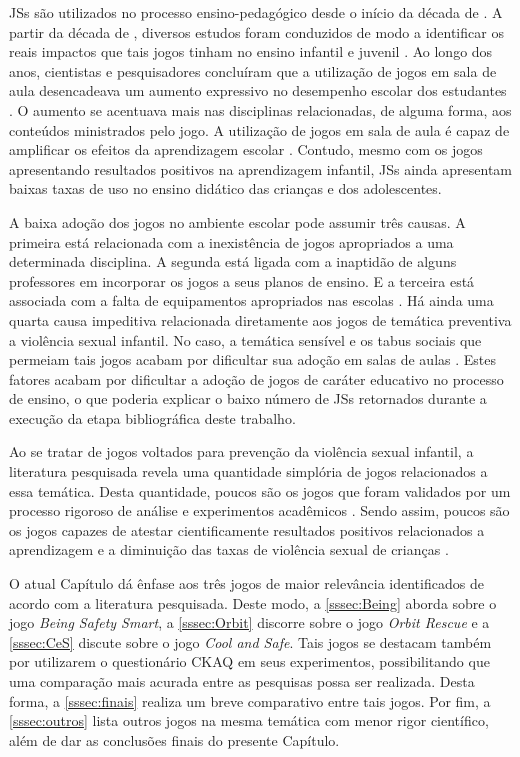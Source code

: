 \acfp{JS} são utilizados no processo ensino-pedagógico desde o início da década de \citeyear{clark1970serious}. A partir da década de \citeyear{clark1970serious}, diversos estudos foram conduzidos de modo a identificar os reais impactos que tais jogos tinham no ensino infantil e juvenil \cite{stieler2016paper}. Ao longo dos anos, cientistas e pesquisadores concluíram que a utilização de jogos em sala de aula desencadeava um aumento expressivo no desempenho escolar dos estudantes \cite{wentzel1998social}. O aumento se acentuava mais nas disciplinas relacionadas, de alguma forma, aos conteúdos ministrados pelo jogo. A utilização de jogos em sala de aula é capaz de amplificar os efeitos da aprendizagem escolar \cite{jones2020serious}. Contudo, mesmo com os jogos apresentando resultados positivos na aprendizagem infantil, \acp{JS} ainda apresentam baixas taxas de uso no ensino didático das crianças e dos adolescentes. 

A baixa adoção dos jogos no ambiente escolar pode assumir três causas. A primeira está relacionada com a inexistência de jogos apropriados a uma determinada disciplina. A segunda está ligada com a inaptidão de alguns professores em incorporar os jogos a seus planos de ensino. E a terceira está associada com a falta de equipamentos apropriados nas escolas \cite{colleen2016advancing}. Há ainda uma quarta causa impeditiva relacionada diretamente aos jogos de temática preventiva a violência sexual infantil. No caso, a temática sensível e os tabus sociais que permeiam tais jogos acabam por dificultar sua adoção em salas de aulas \cite{chen2007prevention}. Estes fatores acabam por dificultar a adoção de jogos de caráter educativo no processo de ensino, o que poderia explicar o baixo número de \acp{JS} retornados durante a execução da etapa bibliográfica deste trabalho.

Ao se tratar de jogos voltados para prevenção da violência sexual infantil, a literatura pesquisada revela uma quantidade simplória de jogos relacionados a essa temática. Desta quantidade, poucos são os jogos que foram validados por um processo rigoroso de análise e experimentos acadêmicos \cite{colleen2016advancing}. Sendo assim, poucos são os jogos capazes de atestar cientificamente resultados positivos relacionados a aprendizagem e a diminuição das taxas de violência sexual de crianças \cite{jones2010being}.

O atual Capítulo dá ênfase aos três jogos de maior relevância identificados de acordo com a literatura pesquisada. Deste modo, a \autoref{sssec:Being} aborda sobre o jogo \textit{Being Safety Smart}, a \autoref{sssec:Orbit} discorre sobre o jogo \textit{Orbit Rescue} e a \autoref{sssec:CeS} discute sobre o jogo \textit{Cool and Safe}. Tais jogos se destacam também por utilizarem o questionário \ac{CKAQ} em seus experimentos, possibilitando que uma comparação mais acurada entre as pesquisas possa ser realizada. Desta forma, a \autoref{sssec:finais} realiza um breve comparativo entre tais jogos. Por fim, a \autoref{sssec:outros} lista outros jogos na mesma temática com menor rigor científico, além de dar as conclusões finais do presente Capítulo. 

